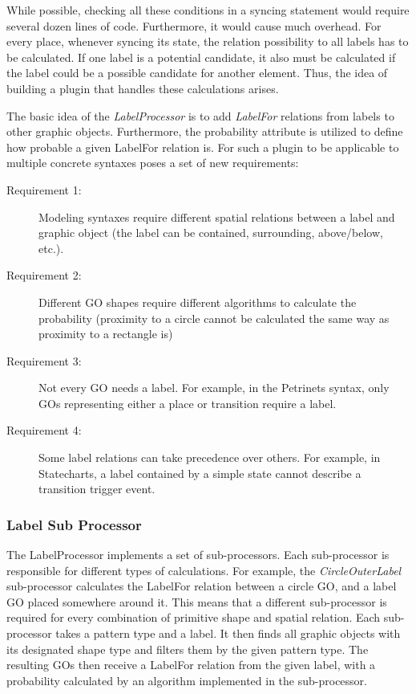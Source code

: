 While possible, checking all these conditions in a syncing statement would require several dozen lines of code. Furthermore, it would cause much overhead. For every place, whenever syncing its state, the relation possibility to all labels has to be calculated. If one label is a potential candidate, it also must be calculated if the label could be a possible candidate for another element. Thus, the idea of building a plugin that handles these calculations arises.

The basic idea of the \emph{LabelProcessor} is to add \emph{LabelFor} relations from labels to other graphic objects. Furthermore, the probability attribute is utilized to define how probable a given LabelFor relation is. For such a plugin to be applicable to multiple concrete syntaxes poses a set of new requirements:
\begin{description}
  \item[Requirement 1:] Modeling syntaxes require different spatial relations between a label and graphic object (the label can be contained, surrounding, above/below, etc.).
  \item[Requirement 2:] Different GO shapes require different algorithms to calculate the probability (proximity to a circle cannot be calculated the same way as proximity to a rectangle is)
  \item[Requirement 3:] Not every GO needs a label. For example, in the Petrinets syntax, only GOs representing either a place or transition require a label.
  \item[Requirement 4:]  Some label relations can take precedence over others. For example, in Statecharts, a label contained by a simple state cannot describe a transition trigger event. 
\end{description}

\subsubsection{Label Sub Processor}
The LabelProcessor implements a set of sub-processors. Each sub-processor is responsible for different types of calculations. For example, the \emph{CircleOuterLabel} sub-processor calculates the LabelFor relation between a circle GO, and a label GO placed somewhere around it. This means that a different sub-processor is required for every combination of primitive shape and spatial relation. Each sub-processor takes a pattern type and a label. It then finds all graphic objects with its designated shape type and filters them by the given pattern type. The resulting GOs then receive a LabelFor relation from the given label, with a probability calculated by an algorithm implemented in the sub-processor.

